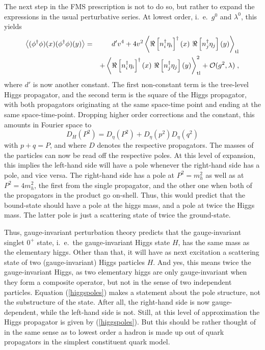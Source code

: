 \documentclass[final,12pt,3p,longtitle]{elsarticle}
\newcommand*{\no}{\noindent}
\newcommand*{\bea}{\begin{eqnarray}}
\newcommand*{\eea}{\end{eqnarray}}
\newcommand*{\be}{\begin{equation}}
\newcommand*{\ee}{\end{equation}}
\newcommand*{\pref}[1]{(\ref{#1})}
\newcommand*{\nn}{\nonumber}
\newcommand*{\1}{1\!\!\!\bot}
\newcommand*{\la}{\left\langle}
\newcommand*{\ra}{\right\rangle}
\begin{document}
The next step in the FMS prescription is not to do so, but rather to expand the expressions in the usual perturbative series. At lowest order, i.\ e.\ $g^0$ and $\lambda^0$, this yields
\bea
\la(\phi^\dagger\phi)(x)(\phi^\dagger\phi)(y)\ra& =& d'v^4+4v^2\la \Re\left[n_i^\dagger\eta_i\right]^\dagger(x)~\Re\left[n_j^\dagger\eta_j\right](y) \ra_\text{tl}\label{op0ppex} \\
&&+\la \Re\left[n_i^\dagger\eta_i\right]^\dagger(x)~\Re\left[n_j^\dagger\eta_j\right](y) \ra_\text{tl}^2+{\cal O}(g^2,\lambda)\nn\;,
\eea
\no where $d'$ is now another constant. The first non-constant term is the tree-level Higgs propagator, and the second term is the square of the Higgs propagator, with both propagators originating at the same space-time point and ending at the same space-time-point. Dropping higher order corrections and the constant, this amounts in Fourier space to
\be
D_{H}(P^2)=D_\eta(P^2)+D_\eta(p^2)D_\eta(q^2)\label{higgspoles}
\ee
\no with $p+q=P$, and where $D$ denotes the respective propagators. The masses of the particles can now be read off the respective poles. At this level of expansion, this implies the left-hand side will have a pole whenever the right-hand side has a pole, and vice versa. The right-hand side has a pole at $P^2=m_h^2$ as well as at $P^2=4m_h^2$, the first from the single propagator, and the other one when both of the propagators in the product go on-shell. Thus, this would predict that the bound-state should have a pole at the higgs mass, and a pole at twice the Higgs mass. The latter pole is just a scattering state of twice the ground-state.

Thus, gauge-invariant perturbation theory predicts that the gauge-invariant singlet $0^+$ state, i.\ e.\ the gauge-invariant Higgs state $H$, has the same mass as the elementary higgs. Other than that, it will have as next excitation a scattering state of two (gauge-invariant) Higgs particles $H$. And yes, this means twice the gauge-invariant Higgs, as two elementary higgs are only gauge-invariant when they form a composite operator, but not in the sense of two independent particles. Equation \pref{higgspoles} makes a statement about the pole structure, not the substructure of the state. After all, the right-hand side is now gauge-dependent, while the left-hand side is not. Still, at this level of approximation the Higgs propagator is given by \pref{higgspoles}. But this should be rather thought of in the same sense as to lowest order a hadron is made up out of quark propagators in the simplest constituent quark model.
\end{document}

